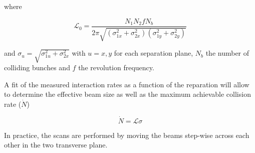 where 

\begin{equation}
\mathcal{L}_{0} = \frac{N_{1}N_{2}fN_{b}}{2\pi\sqrt{(\sigma_{1x}^{2}+\sigma_{2x}^{2})(\sigma_{1y}^{2}+\sigma_{2y}^{2})}}
\end{equation}

and $\sigma_{u} = \sqrt{\sigma_{1u}^{2}+\sigma_{2x}^{2}}$ with $u=x,y$ for each separation plane, $N_{b}$ the number of colliding bunches and $f$ the revolution frequency.

A fit of the measured interaction rates as a function of the reparation will allow to determine the effective beam size as well as the maximum achievable collision rate ($\dot{N}$)

\begin{equation}
\dot{N} = \mathcal{L}\sigma
\end{equation}

In practice, the scans are performed by moving the beams step-wise across each other in the two transverse plane.





